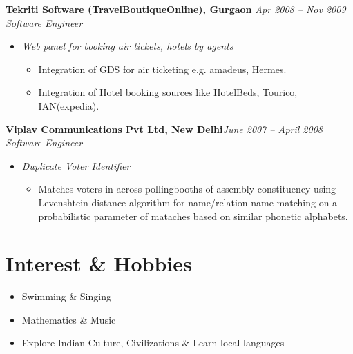 \documentclass[margin,line]{resume}
\begin{document}
\begin{resume}
    \textbf{Tekriti Software (TravelBoutiqueOnline), Gurgaon }\hfill \textsl{Apr 2008 -- Nov 2009}\vspace{0mm}\\\vspace{0mm}%
    \textsl{Software Engineer} \\
     \begin{itemize}
     \item \textsl{Web panel for booking air tickets, hotels by agents}
            \begin{itemize}
             \item Integration of GDS for air ticketing e.g. amadeus, Hermes.
             \item Integration of Hotel booking sources like HotelBeds, Tourico, IAN(expedia).
             \end{itemize}
      \end{itemize}
 
    \textbf{Viplav Communications Pvt Ltd, New Delhi}\hfill \textsl{June 2007 -- April 2008}\vspace{0mm}\\\vspace{0mm}%
    \textsl{Software Engineer}
     \begin{itemize}
        \item \textsl{Duplicate Voter Identifier}\begin{itemize}
        \item Matches voters in-across pollingbooths of assembly constituency using Levenshtein distance algorithm for name/relation name matching on a probabilistic parameter of mataches based on similar phonetic alphabets.
     \end{itemize}
   \end{itemize}
  
    
 \section{\mysidestyle Interest \& Hobbies}
 \begin{itemize}
    \item Swimming \& Singing
    \item Mathematics \& Music
    \item Explore Indian Culture, Civilizations \& Learn local languages
 \end{itemize}
  
\end{resume}
\end{document}
